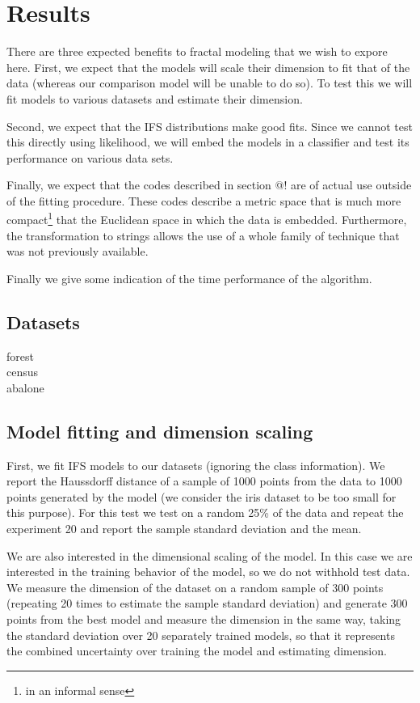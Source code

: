 \documentclass[11pt]{article}
\theoremstyle{definition}
\begin{document}
\section{Results}

There are three expected benefits to fractal modeling that we wish to expore here. First, we expect that the models will scale their dimension to fit that of the data (whereas our comparison model will be unable to do so). To test this we will fit models to various datasets and estimate their dimension. 

Second, we expect that the IFS distributions make good fits. Since we cannot test this directly using likelihood, we will embed the models in a classifier and test its performance on various data sets.

Finally, we expect that the codes described in section @! are of actual use outside of the fitting procedure. These codes describe a metric space that is much more compact\footnote{in an informal sense} that the Euclidean space in which the data is embedded. Furthermore, the transformation to strings allows the use of a whole family of technique that was not previously available.

Finally we give some indication of the time performance of the algorithm.

\subsection{Datasets}

\begin{description}
  \item[forest]
  \item[census]
  \item[abalone]
\end{description}

\subsection{Model fitting and dimension scaling}

First, we fit IFS models to our datasets (ignoring the class information). We report the Haussdorff distance of a sample of 1000 points from the data to 1000 points generated by the model (we consider the iris dataset to be too small for this purpose). For this test we test on a random 25\% of the data and repeat the experiment 20 and report the sample standard deviation and the mean.

We are also interested in the dimensional scaling of the model. In this case we are interested in the training behavior of the model, so we do not withhold test data. We measure the dimension of the dataset on a random sample of 300 points (repeating 20 times to estimate the sample standard deviation) and generate 300 points from the best model and measure the dimension in the same way, taking the standard deviation over 20 separately trained models, so that it represents the combined uncertainty over training the model and estimating dimension.
\end{document}
